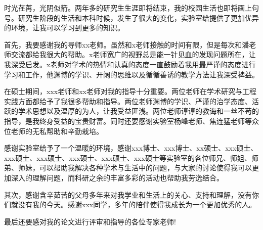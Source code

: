 ﻿时光荏苒，光阴似箭。两年多的研究生生涯即将结束，我的校园生活也即将画上句号。研究生阶段的生活和本科时候，发生了很大的变化，实验室给提供了更加优异的环境，让我可以学习到更多的知识。

首先，我要感谢我的导师xx老师。虽然和x老师接触的时间有限，但是每次和潘老师交流都给我很大的帮助。x老师宽广的视野总是能一针见血的发现问题所在，让我深受启发。x老师对学术的热情和认真的态度一直鼓励着我用最严谨的态度进行学习和工作，他渊博的学识、开阔的思维以及循循善诱的教学方法让我深受裨益。

在硕士期间，xxx老师和xx老师对我的指导十分重要。两位老师在学术研究与工程实践方面都给予了我很多帮助和指导。两位老师渊博的学识、严谨的治学态度、活跃的学术思想以及温厚的为人，让我受益匪浅。两位老师谆谆的教诲和一丝不苟的指导，是我终身受益的宝贵财富。同时还要感谢实验室杨峰老师、焦连猛老师等众位老师的无私帮助和辛勤栽培。

感谢实验室给予了一个温暖的环境，感谢xxx博士、xxx博士、xx硕士、xxx硕士、xxx硕士、xxx硕士、xxx硕士、xxx硕士、xxx硕士等实验室的各位师兄、师姐、师弟、师妹，可以帮助我解决各种学术与生活中的问题，与大家的讨论使得我可以更加深入的理解问题，而科研之余的丰富多彩的活动也帮助我劳逸结合。

其次，感谢含辛茹苦的父母多年来对我学业和生活上的关心、支持和理解，没有你们就没有我的今天。感谢xxx同学，多年的陪伴使得我成长为一个更加优秀的人。

最后还要感对我的论文进行评审和指导的各位专家老师!